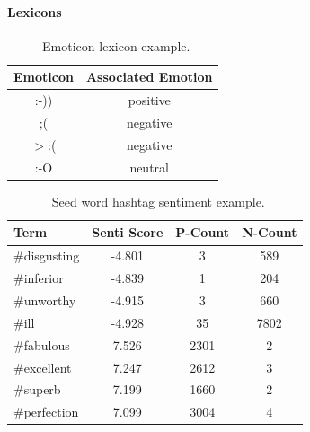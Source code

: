 \documentclass[11pt,letterpaper]{article}
\begin{document}
\paragraph{Lexicons}
\begin{table}
\begin{center}
\begin{tabular}{|c|c|}
\hline
\bf Emoticon & \bf Associated Emotion \\ 
\hline
 :-)) & positive \\
 ;(  &    negative \\
 $>$:(  &   negative \\
 :-O  &   neutral \\
\hline
\end{tabular}
\end{center}
\caption{\label{emoticon-table} ~Emoticon lexicon example. }
\end{table}

\begin{table}
\begin{center}
\begin{tabular}{|l|c|c|c|}
\hline
\bf Term & \bf Senti Score & \bf P-Count & \bf N-Count \\ 
\hline
\#disgusting  & -4.801 & 3    & 589 \\
\#inferior    & -4.839 & 1    & 204 \\
\#unworthy    & -4.915 & 3    & 660 \\
\#ill         & -4.928 & 35   & 7802 \\
\#fabulous    &  7.526 & 2301 & 2 \\
\#excellent   &  7.247 & 2612 & 3 \\
\#superb      &  7.199 & 1660 & 2 \\
\#perfection  &  7.099 & 3004 & 4 \\
\hline
\end{tabular}
\end{center}
\caption{\label{seedword-table} ~Seed word hashtag sentiment example. }
\end{table}
\end{document}
